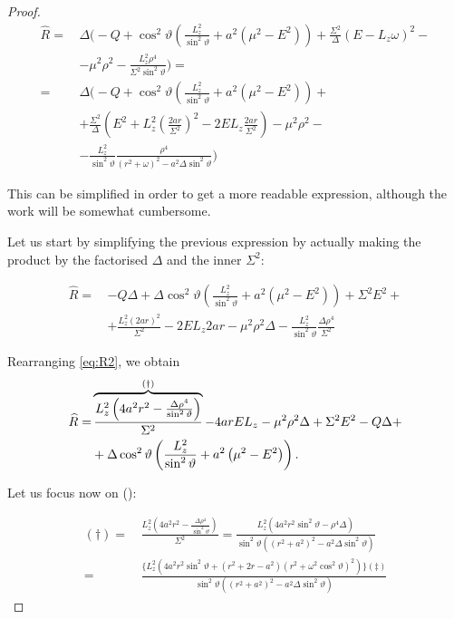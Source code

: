 \begin{proof}
	\begin{align}
	\widehat{R} =\,& \Delta \biggl( -Q + \cos^2\vartheta\left( \frac{L_z^2}{\sin^2\vartheta} + a^2 (\mu^2 - E^2) \right) + \frac{\Sigma^2}{\Delta}(E - L_z\omega)^2 - \nonumber \\
	&- \mu^2\rho^2 - \frac{L_z^2\rho^4}{\Sigma^2\sin^2\vartheta} \biggr) = \nonumber \\
	=\,& \Delta \biggl( -Q + \cos^2\vartheta\left( \frac{L_z^2}{\sin^2\vartheta} + a^2 (\mu^2 - E^2) \right) + \nonumber \\
	&+ \frac{\Sigma^2}{\Delta}\left( E^2 + L_z^2\left( \frac{2ar}{\Sigma^2} \right)^2 - 2EL_z\frac{2ar}{\Sigma^2} \right)  - \mu^2\rho^2 - \nonumber \\
	&- \frac{L_z^2}{\sin^2\vartheta}\frac{\rho^4}{(r^2 + \omega)^2 - a^2\Delta\sin^2\vartheta} \biggr)
	\end{align}
	
	This can be simplified in order to get a more readable expression, although the work will be somewhat cumbersome.
	
	Let us start by simplifying the previous expression by actually making the product by the factorised $\Delta$ and the inner $\Sigma^2$:
	
	\begin{align}
	\widehat{R} =\,& -Q\Delta + \Delta\cos^2\vartheta\left( \frac{L_z^2}{\sin^2\vartheta} + a^2 (\mu^2 - E^2) \right) + \Sigma^2 E^2 + \nonumber \\
	&+ \frac{L_z^2 (2ar)^2}{\Sigma^2} - 2 E L_z 2ar  - \mu^2\rho^2\Delta - \frac{L_z^2}{\sin^2\vartheta}\frac{\Delta\rho^4}{\Sigma^2}
	\label{eq:R2}
	\end{align}
	
	Rearranging \autoref{eq:R2}, we obtain
	\begin{align}
	\widehat{R} =& \overbrace{\frac{L_z^2 \left(4a^2r^2 - \frac{\Delta\rho^4}{\sin^2\vartheta}\right)}{\Sigma^2}}^{\text{(\dag)}} - 4 a r E L_z - \mu^2 \rho^2 \Delta + \Sigma^2 E^2 - Q \Delta + \nonumber \\ 
	&+ \Delta\cos^2\vartheta\left(\frac{L_z^2}{\sin^2\vartheta} + a^2\left(\mu^2 - E^2\right)\right).
	\end{align}
	
	Let us focus now on (\dag):
	
	\begin{align}
	(\dag) =\,& \frac{L_z^2 \left(4a^2r^2 - \frac{\Delta\rho^4}{\sin^2\vartheta}\right)}{\Sigma^2} = \frac{L_z^2 \left(4a^2r^2\sin^2\vartheta - \rho^4\Delta \right)}{\sin^2\vartheta\left(\left(r^2+a^2\right)^2 - a^2\Delta\sin^2\vartheta\right)} \nonumber \\
	=\,& \frac{\Biggl\{L_z^2\left(4a^2r^2\sin^2\vartheta+\left(r^2+2r-a^2\right)\left(r^2+\omega^2\cos^2\vartheta\right)^2\right)\Biggr\}(\ddag)}{\sin^2\vartheta\left(\left(r^2+a^2\right)^2-a^2\Delta\sin^2\vartheta\right)}
	\end{align}
	

\end{proof}
